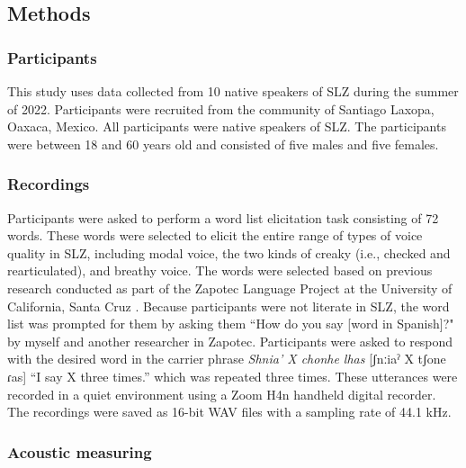\subsection{Methods} \label{sec:methods}
\subsubsection{Participants} \label{sec:participants}
This study uses data collected from 10 native speakers of SLZ during the summer of 2022. Participants were recruited from the community of Santiago Laxopa, Oaxaca, Mexico. All participants were native speakers of SLZ. The participants were between 18 and 60 years old and consisted of five males and five females.

\subsubsection{Recordings} \label{sec:recordings} 
Participants were asked to perform a word list elicitation task consisting of 72 words. These words were selected to elicit the entire range of types of voice quality in SLZ, including modal voice, the two kinds of creaky (i.e., checked and rearticulated), and breathy voice. The words were selected based on previous research conducted as part of the Zapotec Language Project at the University of California, Santa Cruz \citep{ZapotecLanguageProject}. 
Because participants were not literate in SLZ, the word list was prompted for them by asking them ``How do you say [word in Spanish]?" by myself and another researcher in Zapotec. Participants were asked to respond with the desired word in the carrier phrase \textit{Shnia' X chonhe lhas} [ʃnːiaˀ X tʃone ɾas] ``I say X three times.'' which was repeated three times. These utterances were recorded in a quiet environment using a Zoom H4n handheld digital recorder. The recordings were saved as 16-bit WAV files with a sampling rate of 44.1 kHz.

\subsubsection{Acoustic measuring} \label{sec:acoustics}

